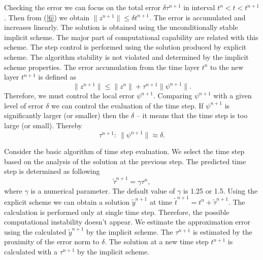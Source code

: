 \documentclass{aip-cp}
\begin{document}
Checking the error we can focus on the total error $\delta\tau^{n+1}$ in interval $t^n < t < t^{n+1}$. Then from (\ref{6}) we obtain
$\|z^{n+1}\| \leq \delta t^{n+1}.$
The error is accumulated and increases linearly.
The solution is obtained using the unconditionally stable implicit scheme.
The major part of computational capability are related with this scheme.
The step control is performed using the solution produced by explicit scheme.
The algorithm stability is not violated and determined by the implicit scheme properties.
The error accumulation from the time layer $t^n$ to the new layer $t^{n+1}$  is defined as
\begin{equation}\label{7}
\|z^{n+1}\| \leq \|z^{n}\| + \tau^{n+1} \|\psi^{n+1}\| .
\end{equation}
Therefore, we must control the local error $\psi^{n+1}$. Comparing $\psi^{n+1}$ with a given level of error $\delta$ we can control the evaluation of the time step. If $\psi^{n+1}$ is significantly larger (or smaller) then the $\delta$ -- it means that the time step is too large (or small). Thereby
\begin{equation}\label{8}
  \tau^{n+1}: \ \|\psi^{n+1}\| \approx \delta .
\end{equation} 

Consider the basic algorithm of time step evaluation. We select the time step based on the analysis of the solution at the previous step. The predicted time step is determined as following
\begin{equation}\label{9}
 \widetilde{\tau}^{n+1} = \gamma \tau^n , 
\end{equation}
where $\gamma$ is a numerical parameter. The default value of $\gamma$ is 1.25 or 1.5. Using the explicit scheme we can obtain a solution $\widetilde{y}^{n+1}$ at time $\widetilde{t}^{n+1} = t^n + \widetilde{\tau}^{n+1}$. The calculation is performed only at single time step. Therefore, the possible computational instability doesn't appear.
We estimate the approximation error using the calculated $\widetilde{y}^{n+1}$ by the implicit scheme. The $\tau^{n+1}$ is estimated by the proximity of the error norm to $\delta$. The solution at a new time step $t^{n+1}$ is calculated with a $\tau^{n+1}$  by the implicit scheme.

\end{document}
